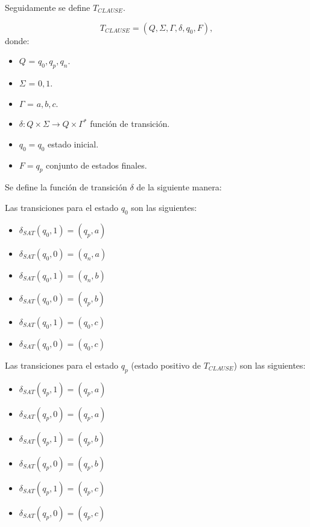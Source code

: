 Seguidamente se define $T_{CLAUSE}$.

\[
    T_{CLAUSE} = (Q, {\Sigma}, \Gamma, \delta, q_{0}, F),
\]
donde:
\begin{itemize}
    \item \(Q\) = ${q_0,q_p,q_n}$.
    \item \(\Sigma\) = ${0,1}$.
    \item \(\Gamma\) = ${a,b,c}$.
    \item \(\delta: Q \times \Sigma \to Q \times \Gamma^*\) función de transición.
    \item \(q_{0} = q_0\) estado inicial.
    \item \(F={q_p}\) conjunto de estados finales.
\end{itemize}

Se define la función de transición $\delta$ de la siguiente manera:


Las transiciones para el estado $q_0$ son las siguientes:
\begin{multicols}{2}
    \begin{itemize}
        \item $\delta_{SAT}(q_0,1)=(q_p,a)$
        \item $\delta_{SAT}(q_0,0)=(q_n,a)$
        \item $\delta_{SAT}(q_0,1)=(q_n,b)$
        \item $\delta_{SAT}(q_0,0)=(q_p,b)$
        \item $\delta_{SAT}(q_0,1)=(q_0,c)$
        \item $\delta_{SAT}(q_0,0)=(q_0,c)$
    \end{itemize}
\end{multicols}

Las transiciones para el estado $q_p$ (estado positivo de $T_{CLAUSE}$) son las siguientes:
\begin{multicols}{2}
    \begin{itemize}
        \item $\delta_{SAT}(q_{p},1)=(q_{p},a)$
        \item $\delta_{SAT}(q_{p},0)=(q_{p},a)$
        \item $\delta_{SAT}(q_{p},1)=(q_{p},b)$
        \item $\delta_{SAT}(q_{p},0)=(q_{p},b)$
        \item $\delta_{SAT}(q_{p},1)=(q_{p},c)$
        \item $\delta_{SAT}(q_{p},0)=(q_{p},c)$
    \end{itemize}
\end{multicols}

